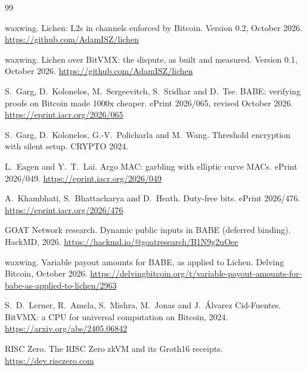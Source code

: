 \documentclass[11pt]{article}
\begin{document}
\begin{thebibliography}{99}

 waxwing. Lichen: L2s in channels enforced by Bitcoin. Version 0.2, October 2026. \url{https://github.com/AdamISZ/lichen}

 waxwing. Lichen over BitVMX: the dispute, as built and measured. Version 0.1, October 2026. \url{https://github.com/AdamISZ/lichen}

 S.~Garg, D.~Kolonelos, M.~Sergeevitch, S.~Sridhar and D.~Tse. BABE: verifying proofs on Bitcoin made 1000x cheaper. ePrint 2026/065, revised October 2026. \url{https://eprint.iacr.org/2026/065}

 S.~Garg, D.~Kolonelos, G.-V.~Policharla and M.~Wang. Threshold encryption with silent setup. CRYPTO 2024.

 L.~Eagen and Y.~T.~Lai. Argo MAC: garbling with elliptic curve MACs. ePrint 2026/049. \url{https://eprint.iacr.org/2026/049}

 A.~Khambhati, S.~Bhattacharya and D.~Heath. Duty-free bits. ePrint 2026/476. \url{https://eprint.iacr.org/2026/476}

 GOAT Network research. Dynamic public inputs in BABE (deferred binding). HackMD, 2026. \url{https://hackmd.io/@goatresearch/B1N9g2uOee}

 waxwing. Variable payout amounts for BABE, as applied to Lichen. Delving Bitcoin, October 2026. \url{https://delvingbitcoin.org/t/variable-payout-amounts-for-babe-as-applied-to-lichen/2963}

 S.~D.~Lerner, R.~Amela, S.~Mishra, M.~Jonas and J.~\'Alvarez Cid-Fuentes. BitVMX: a CPU for universal computation on Bitcoin, 2024. \url{https://arxiv.org/abs/2405.06842}

 RISC Zero. The RISC Zero zkVM and its Groth16 receipts. \url{https://dev.risczero.com}

\end{thebibliography}
\end{document}
